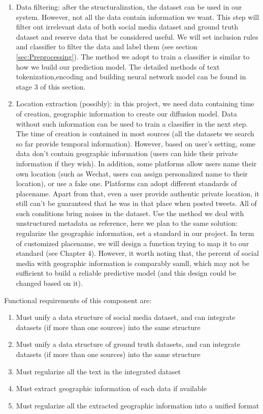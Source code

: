 \begin{enumerate}
    \item Data filtering: after the structuralization, the dataset can be used in our system. However, not all the data contain information we want. This step will filter out irrelevant data of both social media dataset and ground truth dataset and reserve data that be considered useful. We will set inclusion rules and classifier to filter the data and label them (see section \ref{sec:Preprocessing}). The method we adopt to train a classifier is similar to how we build our prediction model. The detailed methods of text tokenization,encoding and building neural network model can be found in stage 3 of this section.
    \item Location extraction (possibly): in this project, we need data containing time of creation, geographic information to create our diffusion model. Data without such information can be used to train a classifier in the next step. The time of creation is contained in most sources (all the datasets we search so far provide temporal information). However, based on user's setting, some data don't contain geographic information (users can hide their private information if they wish). In addition, some platforms allow users name their own location (such as Wechat, users can assign personalized name to their location), or use a fake one. Platforms can adopt different standards of placename. Apart from that, even a user provide authentic private location, it still can't be guaranteed that he was in that place when posted tweets. All of such conditions bring noises in the dataset. Use the method we deal with unstructured metadata as reference, here we plan to the same solution: regularize the geographic information, set a standard in our project. In term of customized placename, we will design a function trying to map it to our standard (see Chapter 4). However, it worth noting that, the percent of social media with geographic information is comparably samll, which may not be sufficient to build a reliable predictive model (and this design could be changed based on it).
\end{enumerate}
Functional requirements of this component are:
\begin{enumerate}
    \item Must unify a data structure of social media dataset, and can integrate datasets (if more than one sources) into the same structure
    \item Must unify a data structure of ground truth datasets, and can integrate datasets (if more than one sources) into the same structure
    \item Must regularize all the text in the integrated dataset
    \item Must extract geographic information of each data if available
    \item Must regularize all the extracted geographic information into a unified format
\end{enumerate}
